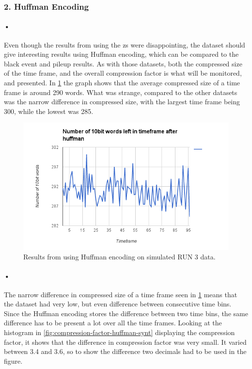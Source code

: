 \documentclass[a4paper, 12pt]{report}
\begin{document}
\subsubsection{2. Huffman Encoding}

\paragraph{•}
Even though the results from using the \gls{zs} were disappointing, the dataset should give interesting results using Huffman encoding, which can be compared to the black event and pileup results.
As with those datasets, both the compressed size of the time frame, and the overall compression factor is what will be monitored, and presented.
In \ref{fig:synthetic-huffman} the graph shows that the average compressed size of a time frame is around 290 words.
What was strange, compared to the other datasets was the narrow difference in compressed size, with the largest time frame being 300, while the lowest was 285.


\begin{figure}[h!]
	\centering
		\includegraphics[width=1.0\textwidth]{images/huffman-fake-pileup.png}
		\caption{Results from using Huffman encoding on simulated RUN 3 data.}
		\label{fig:synthetic-huffman}
\end{figure}

\paragraph{•}
The narrow difference in compressed size of a time frame seen in \ref{fig:synthetic-huffman} means that the dataset had very low, but even difference between consecutive time bins.
Since the Huffman encoding stores the difference between two time bins, the same difference has to be present a lot over all the time frames.
Looking at the histogram in \ref{fig:compression-factor-huffman-synt} displaying the compression factor, it shows that the difference in compression factor was very small.
It varied between 3.4 and 3.6, so to show the difference two decimals had to be used in the figure.
\end{document}

